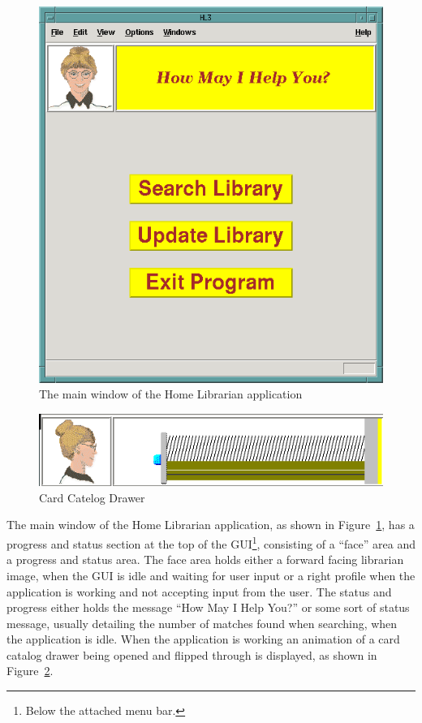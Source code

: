 \begin{figure}[hpt]
\begin{centering}
\includegraphics[width=5in]{MainWindow.png}
\caption{The main window of the Home Librarian application}
\label{fig:ref:MainWindow}
\end{centering}
\end{figure}
\begin{figure}[hpt]
\begin{centering}
\includegraphics[width=5in]{CardCatDrawer.png}
\caption{Card Catelog Drawer}
\label{fig:ref:headerAnimation}
\end{centering}
\end{figure}
The main window of the Home Librarian application, as shown in
Figure~\ref{fig:ref:MainWindow}, has a progress and status section at
the top of the GUI\footnote{Below the attached menu bar.}, consisting
of a ``face'' area and a progress and status area. The face area holds
either a forward facing librarian image, when the GUI is idle and
waiting for user input or a right profile when the application is
working and not accepting input from the user. The status and progress
either holds the message ``How May I Help You?'' or some sort of status
message, usually detailing the number of matches found when searching,
when the application is idle. When the application is working an
animation of a card catalog drawer being opened and flipped through is
displayed, as shown in Figure~\ref{fig:ref:headerAnimation}.

